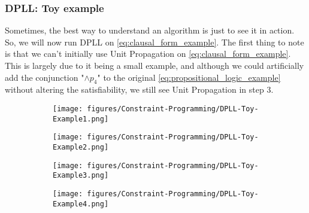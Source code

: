 \subsubsection{DPLL: Toy example}
Sometimes, the best way to understand an algorithm is just to see it in action. So, we will now run DPLL on \autoref{eq:clausal_form_example}. The first thing to note is that we can't initially use Unit Propagation on \autoref{eq:clausal_form_example}. This is largely due to it being a small example, and although we could artificially add the conjunction "\(\wedge p_4\)" to the original \autoref{eq:propositional_logic_example} without altering the satisfiability, we still see Unit Propagation in step 3.
\begin{figure}[H]
    \centering
    \begin{subfigure}[t]{0.45\textwidth}
        \centering
        \texttt{[image: figures/Constraint-Programming/DPLL-Toy-Example1.png]}
    \end{subfigure}
    \begin{subfigure}[t]{0.45\textwidth}
        \centering
        \texttt{[image: figures/Constraint-Programming/DPLL-Toy-Example2.png]}
    \end{subfigure}
\end{figure}

\begin{figure}[H]
    \centering
    \begin{subfigure}[t]{0.45\textwidth}
        \centering
        \texttt{[image: figures/Constraint-Programming/DPLL-Toy-Example3.png]}
    \end{subfigure}
    \begin{subfigure}[t]{0.45\textwidth}
        \centering
        \texttt{[image: figures/Constraint-Programming/DPLL-Toy-Example4.png]}
    \end{subfigure}
\end{figure}

